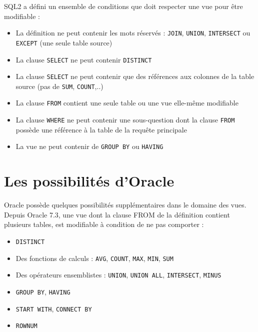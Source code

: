 \documentclass[10pt]{beamer}
\begin{document}
\begin{frame}{\secname}
    SQL2 a défini un ensemble de conditions que doit respecter une vue pour être modifiable :
    \begin{itemize}
        \item La définition ne peut contenir les mots réservés : \lstinline[language=plsql]!JOIN!, \lstinline[language=plsql]!UNION!, \lstinline[language=plsql]!INTERSECT! ou \lstinline[language=plsql]!EXCEPT! (une seule table source)
        \item La clause \lstinline[language=plsql]!SELECT! ne peut contenir \lstinline[language=plsql]!DISTINCT!
        \item La clause \lstinline[language=plsql]!SELECT! ne peut contenir que des références aux colonnes de la table source (pas de \lstinline[language=plsql]!SUM!, \lstinline[language=plsql]!COUNT!,..)
        \item La clause \lstinline[language=plsql]!FROM! contient une seule table ou une vue elle-même modifiable
        \item La clause \lstinline[language=plsql]!WHERE! ne peut contenir une sous-question dont la clause \lstinline[language=plsql]!FROM! possède une référence à la table de la requête principale
        \item La vue ne peut contenir de \lstinline[language=plsql]!GROUP BY! ou \lstinline[language=plsql]!HAVING!
    \end{itemize}
\end{frame}

\section{Les possibilités d'Oracle}
\begin{frame}{\secname}
    Oracle possède quelques possibilités supplémentaires dans le domaine des vues.
    Depuis Oracle 7.3, une vue dont la clause FROM de la définition contient plusieurs tables, est modifiable à condition de ne pas comporter :

    \begin{itemize}
        \item \lstinline[language=plsql]!DISTINCT!
        \item Des fonctions de calculs : \lstinline[language=plsql]!AVG!, \lstinline[language=plsql]!COUNT!, \lstinline[language=plsql]!MAX!, \lstinline[language=plsql]!MIN!, \lstinline[language=plsql]!SUM!
        \item Des opérateurs ensemblistes : \lstinline[language=plsql]!UNION!, \lstinline[language=plsql]!UNION ALL!, \lstinline[language=plsql]!INTERSECT!, \lstinline[language=plsql]!MINUS!
        \item \lstinline[language=plsql]!GROUP BY!, \lstinline[language=plsql]!HAVING!
        \item \lstinline[language=plsql]!START WITH!, \lstinline[language=plsql]!CONNECT BY!
        \item \lstinline[language=plsql]!ROWNUM!
    \end{itemize}
\end{frame}
\end{document}
